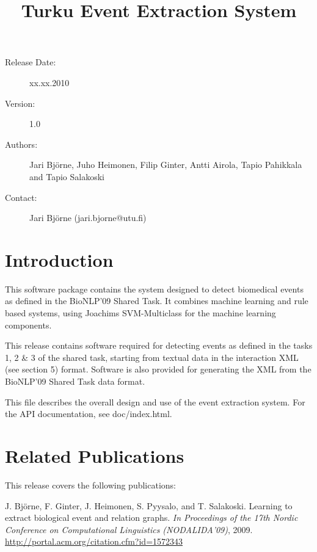 \documentclass[a4paper,12pt]{article}
\title{\vspace{-4cm}Turku Event Extraction System\\}
\author{}
\date{}
\begin{document}
\maketitle

\vspace{-2cm}\begin{description}
\item[Release Date:] xx.xx.2010
\item[Version:] 1.0
\item[Authors:] Jari Bj{\"{o}}rne, Juho Heimonen, Filip Ginter, Antti Airola,
Tapio Pahikkala and Tapio Salakoski
\item[Contact:] Jari Bj{\"{o}}rne (jari.bjorne@utu.fi)
\end{description}

\tableofcontents

\section{Introduction}

This software package contains the system designed to detect biomedical events as
defined in the BioNLP'09 Shared Task. It combines machine learning and rule based
systems, using Joachims SVM-Multiclass for the machine learning components.

This release contains software required for detecting events as
defined in the tasks 1, 2 \& 3 of the shared task, starting from textual data in
the interaction XML (see section 5) format. Software is also provided for
generating the XML from the BioNLP'09 Shared Task data format.

This file describes the overall design and use of the event extraction system.
For the API documentation, see doc/index.html.

\section{Related Publications}

This release covers the following publications:

\vspace{5 mm}

J. Bj{\"{o}}rne, F. Ginter, J. Heimonen, S. Pyysalo, and T. Salakoski. Learning to
extract biological event and relation graphs. \emph{In Proceedings of the 17th
Nordic Conference on Computational Linguistics (NODALIDA’09)}, 2009.
\url{http://portal.acm.org/citation.cfm?id=1572343}
\end{document}
